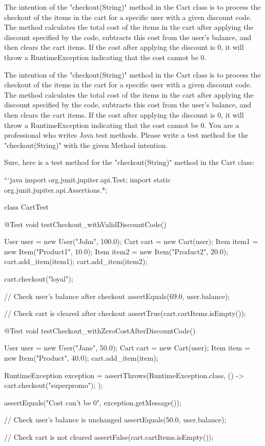 \begin{response}
The intention of the "checkout(String)" method in the Cart class is to process the checkout of the items in the cart for a specific user with a given discount code. The method calculates the total cost of the items in the cart after applying the discount specified by the code, subtracts this cost from the user's balance, and then clears the cart items. If the cost after applying the discount is 0, it will throw a RuntimeException indicating that the cost cannot be 0.
\end{response}

\begin{prompt}
The intention of the "checkout(String)" method in the Cart class is to process the checkout of the items in the cart for a specific user with a given discount code. The method calculates the total cost of the items in the cart after applying the discount specified by the code, subtracts this cost from the user's balance, and then clears the cart items. If the cost after applying the discount is 0, it will throw a RuntimeException indicating that the cost cannot be 0.
You are a professional who writes Java test methods. Please write a test method for the "checkout(String)" with the given Method intention.  
\end{prompt}

\begin{response}
Sure, here is a test method for the "checkout(String)" method in the Cart class:

```java
import org.junit.jupiter.api.Test;
import static org.junit.jupiter.api.Assertions.*;

class CartTest {

    @Test
    void testCheckout_withValidDiscountCode() {
        User user = new User("John", 100.0);
        Cart cart = new Cart(user);
        Item item1 = new Item("Product1", 10.0);
        Item item2 = new Item("Product2", 20.0);
        cart.add_item(item1);
        cart.add_item(item2);

        cart.checkout("loyal");

        // Check user's balance after checkout
        assertEquals(69.0, user.balance);

        // Check cart is cleared after checkout
        assertTrue(cart.cartItems.isEmpty());
    }

    @Test
    void testCheckout_withZeroCostAfterDiscountCode() {
        User user = new User("Jane", 50.0);
        Cart cart = new Cart(user);
        Item item = new Item("Product", 40.0);
        cart.add_item(item);

        RuntimeException exception = assertThrows(RuntimeException.class, () -> {
            cart.checkout("superpromo");
        });

        assertEquals("Cost can't be 0", exception.getMessage());

        // Check user's balance is unchanged
        assertEquals(50.0, user.balance);

        // Check cart is not cleared
        assertFalse(cart.cartItems.isEmpty());
    }
}
\end{response}

